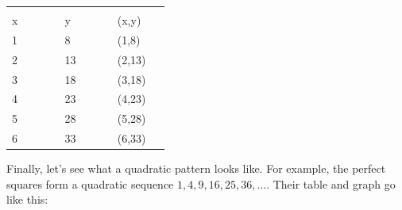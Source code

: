 \bigskip
\begin{minipage}[c]{0.5\textwidth }
	\centering
	\begin{tabular}{|C{0.25\linewidth}|C{0.25\linewidth}|C{0.25\linewidth}|}
	\hline
	 &  & \\
	x & y & (x,y)\\ & 8 & (1,8)\\
	2 & 13 & (2,13)\\
	3 & 18 & (3,18)\\
	4 & 23 & (4,23)\\
	5 & 28 & (5,28)\\
	6 & 33 & (6,33)\\\hline
	\end{tabular}
\end{minipage}%
%
\begin{minipage}[c]{0.5\textwidth }
	\centering
\end{minipage}
\medskip

Finally, let's see what a quadratic pattern looks like. For example, the perfect squares form a quadratic sequence $1, 4, 9, 16, 25, 36, \dotsc$. Their table and graph go like this:

